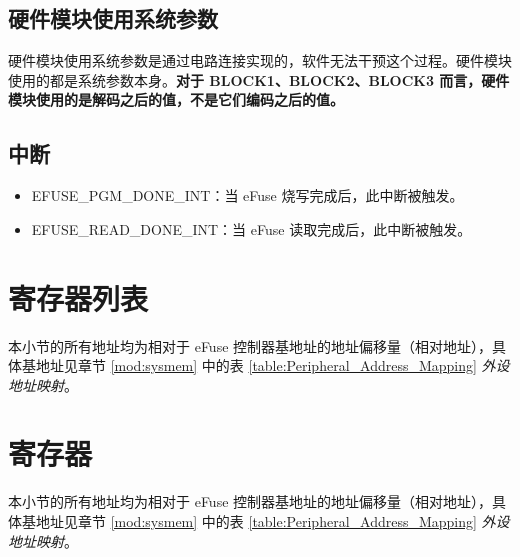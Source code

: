 \documentclass[main\_\_CN.tex]{subfiles}
\begin{document}


\subsection{硬件模块使用系统参数}
硬件模块使用系统参数是通过电路连接实现的，软件无法干预这个过程。硬件模块使用的都是系统参数本身。\textbf{对于 BLOCK1、BLOCK2、BLOCK3 而言，硬件模块使用的是解码之后的值，不是它们编码之后的值。}

\subsection{中断}
\begin{itemize}
\item \label{int:EFUSEPGMDONEINT}EFUSE\_PGM\_DONE\_INT：当 eFuse 烧写完成后，此中断被触发。
\item \label{int:EFUSEREADDONEINT}EFUSE\_READ\_DONE\_INT：当 eFuse 读取完成后，此中断被触发。
\end{itemize}

\newpage
\hypertarget{efuse-reg-summ}{}
\section{寄存器列表}
本小节的所有地址均为相对于 eFuse 控制器基地址的地址偏移量（相对地址），具体基地址见章节 \ref{mod:sysmem} \textit{} 中的表 \ref{table:Peripheral_Address_Mapping} \textit{外设地址映射}。

\label{15.4}

\clearpage
\section{寄存器}
本小节的所有地址均为相对于 eFuse 控制器基地址的地址偏移量（相对地址），具体基地址见章节 \ref{mod:sysmem} \textit{} 中的表 \ref{table:Peripheral_Address_Mapping} \textit{外设地址映射}。

\end{document}

